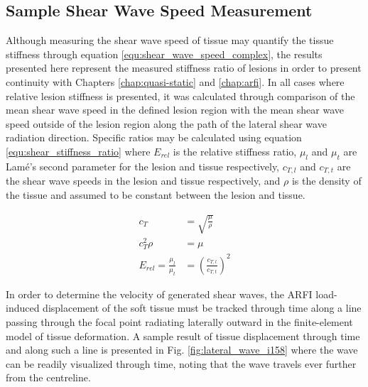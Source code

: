 		\subsection{Sample Shear Wave Speed Measurement}
		\label{subsubsec:shear_results_sample_wave_speed}
			Although measuring the shear wave speed of tissue may quantify the tissue stiffness through equation \ref{equ:shear_wave_speed_complex}, the results presented here represent the measured stiffness ratio of lesions in order to present continuity with Chapters \ref{chap:quasi-static} and \ref{chap:arfi}. In all cases where relative lesion stiffness is presented, it was calculated through comparison of the mean shear wave speed in the defined lesion region with the mean shear wave speed outside of the lesion region along the path of the lateral shear wave radiation direction. Specific ratios may be calculated using equation \ref{equ:shear_stiffness_ratio} where $E_{rel}$ is the relative stiffness ratio, $\mu_l$ and $\mu_t$ are Lam\'{e}'s second parameter for the lesion and tissue respectively, $c_{T,l}$ and $c_{T,t}$ are the shear wave speeds in the lesion and tissue respectively, and $\rho$ is the density of the tissue and assumed to be constant between the lesion and tissue.

			\begin{subequations}
				\label{equ:shear_stiffness_ratio}
				\begin{align}
					c_T &= \sqrt{\frac{\mu}{\rho}} \\
					c_T^2\rho &= \mu \\
					E_{rel} = \frac{\mu_l}{\mu_t} &= \left(\frac{c_{T,l}}{c_{T,t}}\right)^2
				\end{align}
			\end{subequations}

			In order to determine the velocity of generated shear waves, the ARFI load-induced displacement of the soft tissue must be tracked through time along a line passing through the focal point radiating laterally outward in the finite-element model of tissue deformation. A sample result of tissue displacement through time and along such a line is presented in Fig. \ref{fig:lateral_wave_i158} where the wave can be readily visualized through time, noting that the wave travels ever further from the centreline.

